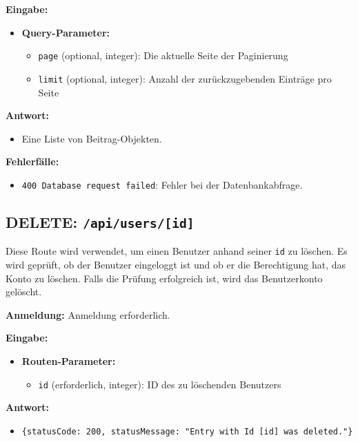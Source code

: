 \documentclass[a4paper,12pt]{article}
\begin{document}
\textbf{Eingabe:}
\begin{itemize}
    \item \textbf{Query-Parameter:}
    \begin{itemize}
        \item \texttt{page} (optional, integer):
            Die aktuelle Seite der Paginierung
        \item \texttt{limit} (optional, integer):
            Anzahl der zurückzugebenden Einträge pro Seite
    \end{itemize}
\end{itemize}

\textbf{Antwort:}
\begin{itemize}
    \item Eine Liste von Beitrag-Objekten.
\end{itemize}

\textbf{Fehlerfälle:}
\begin{itemize}
    \item \texttt{400 Database request failed}: Fehler bei der Datenbankabfrage.
\end{itemize}

\subsection{DELETE: \texttt{/api/users/[id]}}

Diese Route wird verwendet, um einen Benutzer anhand seiner \texttt{id} zu
löschen. Es wird geprüft, ob der Benutzer eingeloggt ist und ob er die
Berechtigung hat, das Konto zu löschen. Falls die Prüfung erfolgreich ist, wird
das Benutzerkonto gelöscht.

\textbf{Anmeldung:} Anmeldung erforderlich.

\textbf{Eingabe:}
\begin{itemize}
    \item \textbf{Routen-Parameter:}
    \begin{itemize}
        \item \texttt{id} (erforderlich, integer):
            ID des zu löschenden Benutzers
    \end{itemize}
\end{itemize}

\textbf{Antwort:}
\begin{itemize}
    \item \texttt{\{statusCode: 200,
        statusMessage: "Entry with Id [id] was deleted."\}}
\end{itemize}
\end{document}
